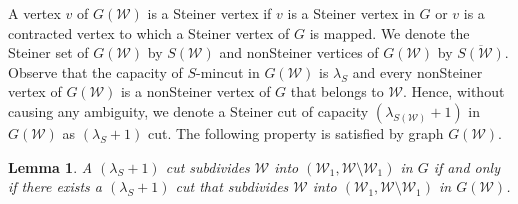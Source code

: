 \documentclass[letterpaper,11pt]{article}
\newtheorem{lemma}{Lemma}[]
\begin{document}
\noindent
A vertex $v$ of $G({\mathcal W})$ is a Steiner vertex if $v$ is a Steiner vertex in $G$ or $v$ is a contracted vertex to which a Steiner vertex of $G$ is mapped. We denote the Steiner set of $G({\mathcal W})$ by $S({\mathcal W})$ and nonSteiner vertices of $G({\mathcal W})$ by $\overline{S({\mathcal W})}$.  Observe that the capacity of $S$-mincut in $G({\mathcal W})$ is $\lambda_S$ and every nonSteiner vertex of $G({\mathcal W})$ is a nonSteiner vertex of $G$ that belongs to ${\mathcal W}$. Hence, without causing any ambiguity, we denote a Steiner cut of capacity $(\lambda_{S({\mathcal W})}+1)$ in $G({\mathcal W})$ as $(\lambda_S+1)$ cut. The following property is satisfied by graph $G({\mathcal W})$. \begin{lemma} \label{lem : G(W)}
   A $(\lambda_S+1)$ cut subdivides ${\mathcal W}$ into $({\mathcal W}_1,{\mathcal W}\setminus {\mathcal W}_1)$ in $G$ if and only if there exists a $(\lambda_S+1)$ cut that subdivides ${\mathcal W}$ into $({\mathcal W}_1,{\mathcal W}\setminus {\mathcal W}_1)$ in $G({\mathcal W})$. 
\end{lemma}
\end{document}
